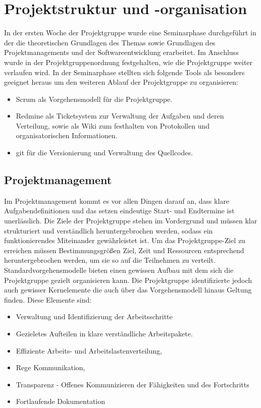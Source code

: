 \chapter{Projektstruktur und -organisation}
\label{sec:orga}

In der ersten Woche der Projektgruppe wurde eine Seminarphase durchgeführt in
der die theoretischen Grundlagen des Themas sowie Grundlagen des
Projektmanagements und der Softwareentwicklung erarbeitet. Im Anschluss wurde in
der Projektgruppenordnung festgehalten, wie die Projektgruppe weiter verlaufen
wird. In der Seminarphase stellten sich folgende Tools als besonders geeignet
heraus um den weiteren Ablauf der Projektgruppe zu organisieren:

\begin{itemize}
    \item Scrum als Vorgehensmodell für die Projektgruppe.
    \item Redmine als Ticketsystem zur Verwaltung der Aufgaben und deren
      Verteilung, sowie als Wiki zum festhalten von Protokollen und
      organisatorischen Informationen.
    \item git für die Versionierung und Verwaltung des Quellcodes.
\end{itemize}

\section{Projektmanagement}
\label{sec:orga:projekt}

Im Projektmanagement kommt es vor allen Dingen darauf an, dass klare
Aufgabendefinitionen und das setzen eindeutige Start- und Endtermine ist
unerlässlich. Die Ziele der Projektgruppe stehen im Vordergrund und müssen klar
strukturiert und verständlich heruntergebrochen werden, sodass ein
funktionierendes Miteinander gewährleistet ist. Um das Projektgruppe-Ziel zu
erreichen müssen Bestimmungsgrößen Ziel, Zeit und Ressourcen entsprechend
heruntergebrochen werden, um sie so auf die Teilnehmen zu verteilt.
Standardvorgehensmodelle bieten einen gewissen Aufbau mit dem sich die
Projektgruppe gezielt organisieren kann. Die Projektgruppe identifizierte jedoch
auch gewisser Kernelemente die auch über das Vorgehensmodell hinaus Geltung
finden.  Diese Elemente sind:

\begin{itemize}
  \item Verwaltung und Identifizierung der Arbeitsschritte
  \item Gezieletes Aufteilen in klare verständliche Arbeitspakete.
  \item Effiziente Arbeits- und Arbeitslastenverteilung,
  \item Rege Kommunikation,
  \item Transparenz - Offenes Kommunizieren der Fähigkeiten und des Fortschritts
  \item Fortlaufende Dokumentation
\end{itemize}

